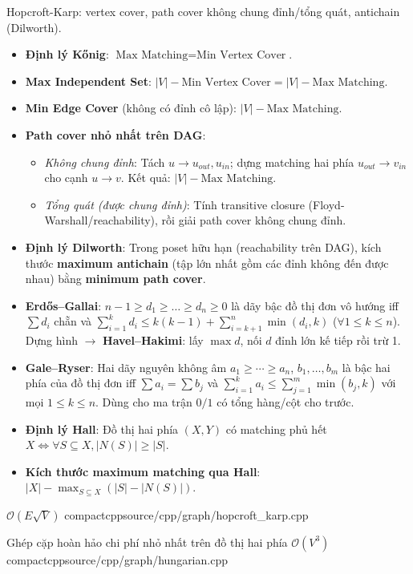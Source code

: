 {Hopcroft-Karp: vertex cover, path cover không chung đỉnh/tổng quát, antichain (Dilworth).
\begin{itemize}
    \item \textbf{Định lý K\H{o}nig}: $\text{Max Matching} = \text{Min Vertex Cover}$.
    \item \textbf{Max Independent Set}: $|V| - \text{Min Vertex Cover} = |V| - \text{Max Matching}$.
    \item \textbf{Min Edge Cover} (không có đỉnh cô lập): $|V| - \text{Max Matching}$.
    \item \textbf{Path cover nhỏ nhất trên DAG}:
    \begin{itemize}
        \item \textit{Không chung đỉnh}: Tách $u \to u_{out}, u_{in}$; dựng matching hai phía $u_{out} \to v_{in}$ cho cạnh $u \to v$. Kết quả: $|V| - \text{Max Matching}$.
        \item \textit{Tổng quát (được chung đỉnh)}: Tính transitive closure (Floyd-Warshall/reachability), rồi giải path cover không chung đỉnh.
    \end{itemize}
    \item \textbf{Định lý Dilworth}: Trong poset hữu hạn (reachability trên DAG), kích thước \textbf{maximum antichain} (tập lớn nhất gồm các đỉnh không đến được nhau) bằng \textbf{minimum path cover}.
    \item \textbf{Erd\H{o}s--Gallai}: $n-1\ge d_1\ge\dots\ge d_n\ge0$ là dãy bậc đồ thị đơn vô hướng iff $\sum d_i$ chẵn và $\sum_{i=1}^{k}d_i\le k(k-1)+\sum_{i=k+1}^{n}\min(d_i,k)$ ($\forall 1\le k\le n$). Dựng hình $\to$ \textbf{Havel--Hakimi}: lấy $\max d$, nối $d$ đỉnh lớn kế tiếp rồi trừ 1.
    \item \textbf{Gale--Ryser}: Hai dãy nguyên không âm $a_1\ge\cdots\ge a_n$, $b_1,\dots,b_m$ là bậc hai phía của đồ thị đơn iff $\sum a_i=\sum b_j$ và $\sum_{i=1}^{k}a_i\le\sum_{j=1}^{m}\min(b_j,k)$ với mọi $1\le k\le n$. Dùng cho ma trận $0/1$ có tổng hàng/cột cho trước.
    \item \textbf{Định lý Hall}: Đồ thị hai phía $(X,Y)$ có matching phủ hết $X \iff \forall S \subseteq X, |N(S)| \ge |S|$.
    \item \textbf{Kích thước maximum matching qua Hall}: $|X| - \max_{S \subseteq X} (|S| - |N(S)|)$.
\end{itemize}
}
{$\mathcal{O}(E\sqrt{V})$}
{compactcpp}{source/cpp/graph/hopcroft_karp.cpp}

{Ghép cặp hoàn hảo chi phí nhỏ nhất trên đồ thị hai phía}
{$\mathcal{O}(V^3)$}
{compactcpp}{source/cpp/graph/hungarian.cpp}

